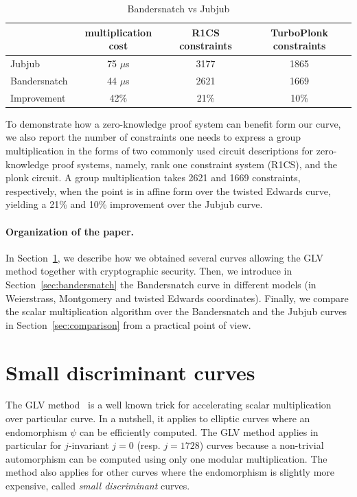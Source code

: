 \documentclass[smallextended]{svjour3}
\begin{document}
\begin{table}[ht] %
  \centering
  
  \begin{tabular}{|l|c|c|c|}\hline
      & multiplication cost & R1CS constraints & TurboPlonk constraints  \\\hline\hline
    Jubjub & 75 $\mu$s  & 3177 &  1865\\\hline
    Bandersnatch & 44 $\mu$s  & 2621 & 1669\\\hline\hline   
    Improvement & 42\% & 21\% & 10\%\\\hline
  \end{tabular}
  \caption{Bandersnatch vs Jubjub}
  \label{tab:comp}
\end{table}

To demonstrate how a zero-knowledge proof system can benefit
form our curve, we also report the number of 
constraints one needs to express a group multiplication
in the forms of 
two commonly used circuit descriptions for zero-knowledge 
proof systems, namely,
rank one constraint system (R1CS), 
and the plonk circuit.
A group multiplication takes 
2621 and 1669
constraints, respectively, when the point is in affine form over the 
twisted Edwards curve,
yielding a 21\% and 10\% improvement over the Jubjub curve.

\paragraph{Organization of the paper.}
In Section~\ref{sec:small-disc-curves}, we describe how we obtained
several curves allowing the GLV method together with cryptographic
security.
Then, we introduce in Section~\ref{sec:bandersnatch} the Bandersnatch
curve in different models (in Weierstrass, Montgomery and twisted Edwards
coordinates).
Finally, we compare the scalar multiplication algorithm over
the Bandersnatch and the Jubjub curves in
Section~\ref{sec:comparison} from a practical point of view.


\section{Small discriminant curves}\label{sec:small-disc-curves}

The GLV method~\cite{C:GalLamVan01} is a well known trick for accelerating
scalar multiplication over particular curve. In a nutshell, it applies
to elliptic curves where an endomorphism $\psi$ can be efficiently computed.
The GLV method applies in particular for $j$-invariant $j=0$
(resp. $j=1728$) curves because a non-trivial automorphism can be
computed using only one modular multiplication. %
The method also applies for other curves where the endomorphism is
slightly more expensive, called \emph{small discriminant} curves.
\end{document}
